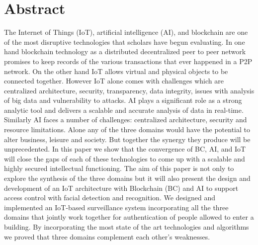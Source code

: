 \chapter*{Abstract}



The Internet of Things (IoT), artificial
intelligence (AI), and blockchain are one of the most disruptive technologies that scholars have begun evaluating. In one hand blockchain technology as a distributed  decentralized peer to peer network promises to keep  records of the various transactions that ever happened in a P2P network. On the other hand IoT allows virtual and physical objects to be connected together. However IoT alone comes with challenges which are centralized architecture, security, transparency, data integrity, issues with analysis of big data and vulnerability to attacks. AI plays a significant role as a strong analytic tool and delivers a scalable and accurate analysis of data in real-time. Similarly AI faces a number of challenges: centralized architecture, security and resource limitations. Alone any of the three domains would have the potential to alter business, leisure and society. But together the synergy they produce will be unprecedented. 
In this paper we show that the convergence of BC, AI, and IoT will close the gaps of each of these technologies to come up with a scalable and highly secured intellectual functioning. The aim of this paper is not only to  explore the synthesis of the three domains but it will also present the design and development of an IoT architecture with Blockchain (BC) and AI to support access control with facial detection and recognition. We designed and implemented an IoT-based surveillance system incorporating all the three domains that jointly work together for authentication of people allowed to enter a building.  By incorporating the most state of the art technologies and algorithms we proved that three domains complement each other's weaknesses. 


\newpage







